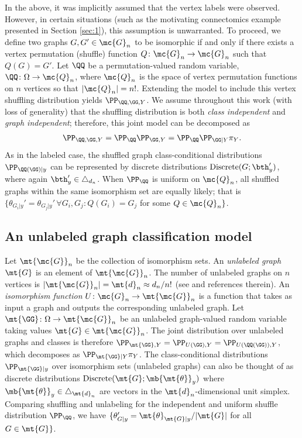 \documentclass[10pt,journal,cspaper,compsoc]{IEEEtran}
\newcommand{\Qs}{Q}
\begin{document}
In the above, it was implicitly assumed that the vertex labels were observed.  However, in certain situations (such as the motivating connectomics example presented in Section \ref{sec:1}), this assumption is unwarranted.  To proceed, we define two graphs $G,G' \in \mc{G}_n$ to be isomorphic if and only if there exists a vertex permutation (shuffle) function $\Qs\colon\mc{G}_n \to \mc{G}_n$ such that $\Qs(G)=G'$.  Let $\QQ$ be a permutation-valued random variable, $\QQ\colon\Omega \to \mc{Q}_n$, where $\mc{Q}_n$ is the space of vertex permutation functions on $n$ vertices so that $|\mc{Q}_n|=n!$.  Extending the model to include this vertex shuffling distribution yields $\PP_{\QQ,\GG,Y}$.  We assume throughout this work (with loss of generality) that the shuffling distribution is both \emph{class independent} and \emph{graph independent}; therefore, this joint model can be decomposed as
\begin{align}
	\PP_{\QQ,\GG,Y} = \PP_{\QQ} \PP_{\GG,Y} = \PP_{\QQ} \PP_{\GG |Y} \pi_Y.
\end{align}
As in the labeled case, the shuffled graph class-conditional distributions $\PP_{\QQ(\GG)|y}$ can be represented by discrete distributions $\text{Discrete}(G; \bth_y')$, where again $\bth_y' \in \triangle_{d_n}$.  When $\PP_{\QQ}$ is uniform on $\mc{Q}_n$, all shuffled graphs within the same isomorphism set are equally likely; that is  $\{\theta_{G_i|y}' = \theta_{G_j|y}' \, \forall G_i,G_j \colon \Qs(G_i)=G_j$ for some $\Qs \in \mc{Q}_n\}$.


\subsection{An unlabeled graph classification model} %
\label{sub:an_unlabeled_graph_classification_model}


Let $\mt{\mc{G}}_n$ be the collection of isomorphism sets.
An \emph{unlabeled graph} $\mt{G}$ is an element of $\mt{\mc{G}}_n$. The number of unlabeled graphs on $n$ vertices is $|\mt{\mc{G}}_n|=\mt{d}_n \approx d_n/n!$ (see \cite{A000088} and references therein).
An \emph{isomorphism function} $U\colon \mc{G}_n \to \mt{\mc{G}}_n$ is a function that takes as input a graph and outputs the corresponding unlabeled graph. Let $\mt{\GG}\colon \Omega \to \mt{\mc{G}}_n$ be an unlabeled graph-valued random variable taking values $\mt{G} \in \mt{\mc{G}}_n$.   The joint distribution over unlabeled graphs and classes is therefore
$\PP_{\mt{\GG},Y}=\PP_{U(\GG),Y}=\PP_{U(\QQ(\GG)),Y}$, which decomposes as $\PP_{\mt{\GG}|Y} \pi_Y$. The class-conditional distributions $\PP_{\mt{\GG} | y}$ over isomorphism sets (unlabeled graphs) can also be thought of as discrete distributions $\text{Discrete}(\mt{G}; \mb{\mt{\theta}}_y)$ where $\mb{\mt{\theta}}_y\in \triangle_{\mt{d}_n}$ are vectors in the $\mt{d}_n$-dimensional unit simplex.   Comparing shuffling and unlabeling for the independent and uniform shuffle distribution $\PP_{\QQ}$, we have $\{\theta_{G|y}'=\mt{\theta}_{\mt{G}|y}/|\mt{G}|$ for all $G \in \mt{G}\}$.  
\end{document}
